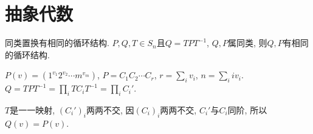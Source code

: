 \chapter{抽象代数}
\bt{}{}
同类置换有相同的循环结构.
\et
\ba
$P,Q,T\in S_n$且$Q=TPT^{-1}$, $Q,P$属同类, 则$Q,P$有相同的循环结构.

$P(v)=(1^{v_1}2^{v_2}\cdots m^{v_m})$, $P=C_1C_2\cdots C_r$, $r=\sum_iv_i$, $n=\sum_iiv_i$.
$Q=TPT^{-1}=\prod_iTC_iT^{-1}=\prod_iC_i'$. 

$T$是一一映射, $(C_i')_i$两两不交, 因$(C_i)_i$两两不交,
$C_i'$与$C_i$同阶, 所以$Q(v)=P(v)$.
\ea